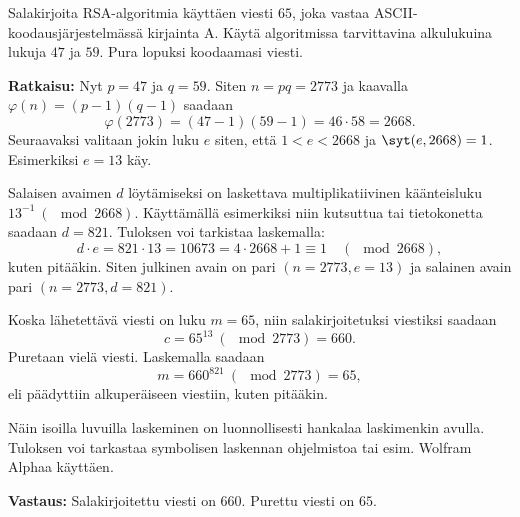 \begin{esimerkki}
Salakirjoita RSA-algoritmia käyttäen viesti $65$, joka vastaa ASCII-koodausjärjestelmässä kirjainta A. Käytä algoritmissa tarvittavina alkulukuina lukuja $47$ ja $59$. Pura lopuksi koodaamasi viesti.

{\bf Ratkaisu:} 
Nyt $p = 47$ ja $q = 59$. Siten $n=pq=2773$ ja kaavalla $\varphi(n)=(p-1)(q-1)$ saadaan
\[
\varphi(2773)=(47-1)(59-1)=46\cdot 58 =2668.
\]
Seuraavaksi valitaan jokin luku $e$ siten, että $1<e<2668$ ja $\syt(e,2668)=1$. Esimerkiksi $e=13$ käy.

Salaisen avaimen $d$ löytämiseksi on laskettava multiplikatiivinen käänteisluku $13^{-1}\ (\mod 2668)$. Käyttämällä esimerkiksi niin kutsuttua  tai tietokonetta saadaan $d=821$. Tuloksen voi tarkistaa laskemalla:
\[
d \cdot e = 821 \cdot 13 = 10673 = 4\cdot 2668 + 1 \equiv 1 \quad (\mod 2668),
\]
kuten pitääkin. Siten julkinen avain on pari $(n=2773, e=13)$ ja salainen avain pari $(n=2773, d=821)$.

Koska lähetettävä viesti on luku $m=65$, niin salakirjoitetuksi viestiksi saadaan
\[
c= 65^{13}\ (\mod  2773) = 660.
\]
Puretaan vielä viesti. Laskemalla saadaan
\[
m=660^{821}\ (\mod  2773) = 65,
\]
eli päädyttiin alkuperäiseen viestiin, kuten pitääkin.

Näin isoilla luvuilla laskeminen on luonnollisesti hankalaa laskimenkin avulla. Tuloksen voi tarkastaa symbolisen laskennan ohjelmistoa tai esim. Wolfram Alphaa käyttäen. 

{\bf Vastaus:} Salakirjoitettu viesti on $660$. Purettu viesti on $65$.
\end{esimerkki}



\Harjoitustehtavat


